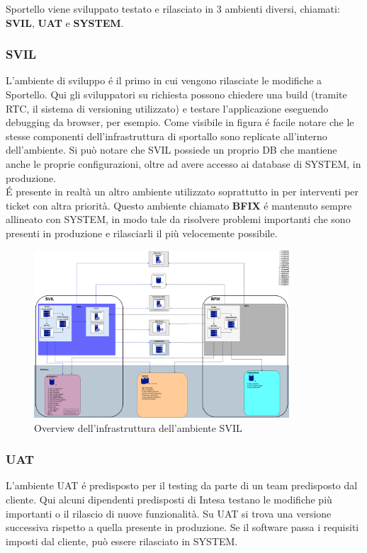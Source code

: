 Sportello viene sviluppato testato e rilasciato in 3 ambienti diversi, chiamati: \textbf{SVIL}, \textbf{UAT} e \textbf{SYSTEM}.

\subsubsection{SVIL}

L'ambiente di sviluppo é il primo in cui vengono rilasciate le modifiche a Sportello. Qui gli sviluppatori su richiesta possono chiedere una build (tramite RTC, il sistema di versioning utilizzato) e testare l'applicazione eseguendo debugging da browser, per esempio. Come visibile in figura é facile notare che le stesse componenti dell'infrastruttura di sportallo sono replicate all'interno dell'ambiente. Si può notare che SVIL possiede un proprio DB che mantiene anche le proprie configurazioni, oltre ad avere accesso ai database di SYSTEM, in produzione. \\
É presente in realtà un altro ambiente utilizzato soprattutto in per interventi per ticket con altra priorità. Questo ambiente chiamato \textbf{BFIX} é mantenuto sempre allineato con SYSTEM, in modo tale da risolvere problemi importanti che sono presenti in produzione e rilasciarli il più velocemente possibile. 


\begin{figure}[!ht]
    \centering
	\includegraphics[width=0.85\textwidth]{./res/img/svil-diag.png}
    \caption{Overview dell'infrastruttura dell'ambiente SVIL}
\end{figure}

\subsubsection{UAT}

L'ambiente UAT é predisposto per il testing da parte di un team predisposto dal cliente. Qui alcuni dipendenti predisposti di Intesa testano le modifiche più importanti o il rilascio di nuove funzionalità. Su UAT si trova una versione successiva rispetto a quella presente in produzione. Se il software passa i requisiti imposti dal cliente, può essere rilasciato in SYSTEM.

